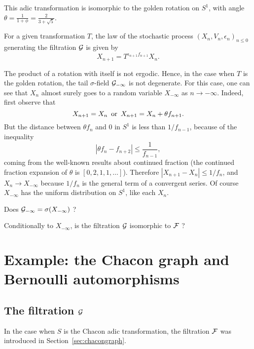 \documentclass[12pt,a4paper]{article}
\begin{document}
This adic transformation  
is isomorphic to the golden rotation on $S^1$, 
with angle $\theta=\frac{1}{1+\phi}=\frac{2}{3+\sqrt{5}}$. 

For a given transformation $T$, the law of the stochastic process 
${(X_n, V_n, \epsilon_n)}_{n \leq 0}$ generating the filtration $\mathcal{G}$ 
is given by 
$$
X_{n+1} = T^{\epsilon_{n+1}f_{n+1}}X_n.
$$

The product of a rotation with itself is not ergodic. 
Hence, in the case when $T$ is the golden rotation, the tail $\sigma$-field 
$\mathcal{G}_{-\infty}$ is not degenerate. 
For this case, one can see that $X_n$ almost surely goes to a random variable $X_{-\infty}$ 
as $n \to -\infty$.  
Indeed, first observe that
$$
X_{n+1} = X_n \, \text{ or\, $X_{n+1} = X_n + \theta f_{n+1}$}. 
$$
But the distance between $\theta f_n$ and $0$ in $S^1$ is less than 
$1/f_{n-1}$, because of the inequality
$$
|\theta f_n - f_{n+2}| \leq \frac{1}{f_{n-1}},
$$
coming from the well-known results about continued fraction 
(the continued fraction expansion of $\theta$ is $[0, 2, 1, 1, \ldots]$). 
Therefore $|X_{n+1} - X_n| \leq 1/f_{n}$, and $X_n \to X_{-\infty}$ because 
$1/f_{n}$ is the general term of a convergent series. 
Of course $X_{-\infty}$ has the uniform distribution on $S^1$, like each $X_n$.

\begin{question}
Does $\mathcal{G}_{-\infty} = \sigma(X_{-\infty})$ ? 
\end{question}

\begin{question}
Conditionally to $X_{-\infty}$, is the filtration $\mathcal{G}$ isomorphic to $\mathcal{F}$ ?  
\end{question}


\section{Example: the Chacon graph and Bernoulli automorphisms}

\subsection{The filtration $\mathcal{G}$}

In the case when $S$ is the Chacon adic transformation, the 
filtration $\mathcal{F}$ was introduced in Section~\ref{sec:chacongraph}. 
\end{document}
